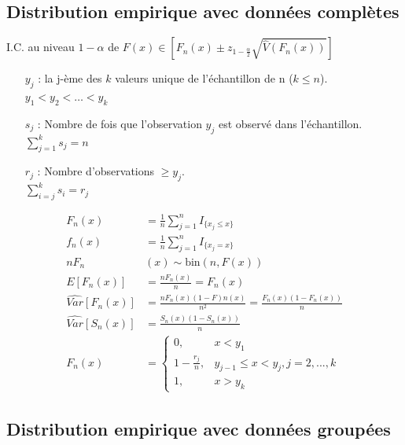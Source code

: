 \documentclass[french, landscape]{article}
\begin{document}
\begin{multicols*}{3}
\subsection*{Distribution empirique avec données complètes}

I.C. au niveau $1 - \alpha$ de $F(x) \in \left[F_n(x) \pm z_{1 - \frac{\alpha}{2}} \sqrt{\widehat{V}(F_n(x))} \right]$
\begin{enumerate}
	\item[$y_j$ : ] la j-ème des $k$ valeurs unique de l'échantillon de n ($k \le n$).\\
	$y_1 < y_2 < \dots < y_k$
	\item[$s_j$ : ] Nombre de fois que l'observation $y_j$ est observé dans l'échantillon.\\
	$\sum_{j = 1}^{k}s_j = n$
	\item[$r_j$ : ] Nombre d'observations $\ge y_j$. \\
	$\sum_{i = j}^{k}s_i = r_j$
\end{enumerate}

\begin{align*}
F_n(x) &= \frac{1}{n} \sum\limits_{j=1}^n I_{\{ x_j \leq x\}} \\
f_n(x) &= \frac{1}{n} \sum\limits_{j=1}^n I_{\{ x_j = x\}}  \\
 n F_n&(x)  \sim \text{bin}(n, F(x))\\
E[F_n(x)] &= \frac{n F_n(x)}{n} = F_n(x)\\
\widehat{Var}[F_n(x)] &= \frac{n F_n(x)(1 - F)n(x)}{n^2} = \frac{F_n(x)(1 - F_n(x))}{n}  \\
\widehat{Var}[S_n(x)] &= \frac{S_n(x)(1 - S_n(x))}{n} \\
F_n(x) &= 
\left\{
	\begin{array}{ll}
		0,  &  x < y_1 \\
        1 - \frac{r_j}{n}, &  y_{j-1} \leq x < y_j, j=2,...,k \\
        1, & x > y_k 
	\end{array}
\right.
\end{align*}

\subsection*{Distribution empirique avec données groupées}

\end{multicols*}
\end{document}
